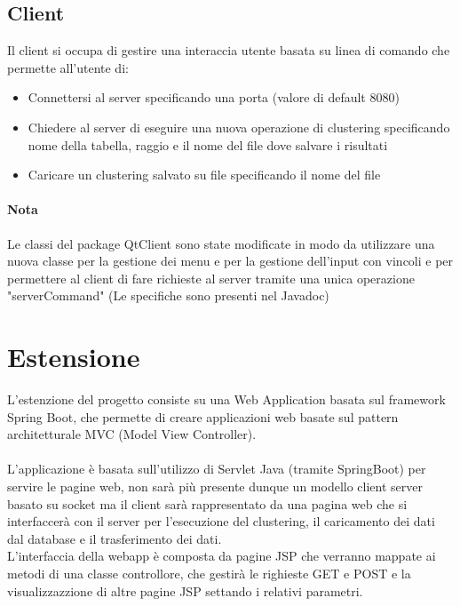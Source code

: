\documentclass{article}
\begin{document}
        \subsection{Client}
        Il client si occupa di gestire una interaccia utente basata su linea di 
        comando che permette all'utente di:
            \begin{itemize}
                \item Connettersi al server specificando una porta (valore di 
                default 8080)
                \item Chiedere al server di eseguire una nuova operazione di
                clustering specificando nome della tabella, raggio e il nome del
                file dove salvare i risultati
                \item Caricare un clustering salvato su file specificando il
                nome del file
            \end{itemize}

        \paragraph{Nota} Le classi del package QtClient sono state modificate 
        in modo da utilizzare una nuova classe per la gestione dei menu e per 
        la gestione dell'input con vincoli e per permettere al client di fare 
        richieste al server tramite una unica operazione "serverCommand" 
        (Le specifiche sono presenti nel Javadoc)
        

    \newpage
    \section{Estensione}
    L'estenzione del progetto consiste su una Web Application basata sul
    framework Spring Boot, che permette di creare applicazioni web basate sul
    pattern architetturale MVC (Model View Controller). \\\\ L'applicazione è basata 
    sull'utilizzo di Servlet Java (tramite SpringBoot) 
    per servire le pagine web, non sarà più presente dunque un modello
     client server 
    basato su socket ma 
    il client sarà rappresentato da una pagina web che si interfaccerà con il
    server per l'esecuzione del clustering, il caricamento dei dati dal database 
    e il trasferimento dei dati.\\

    L'interfaccia della webapp è composta da pagine JSP che verranno mappate ai 
    metodi di una classe controllore, che gestirà le righieste GET e POST e
    la visualizzazzione di altre pagine JSP settando i relativi parametri.
\end{document}
